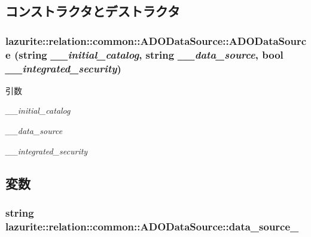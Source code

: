 \subsection{コンストラクタとデストラクタ}
\hypertarget{classlazurite_1_1relation_1_1common_1_1_a_d_o_data_source_ac0e205ee3f2798c66849ce140b9869cc}{
\subsubsection[{ADODataSource}]{\setlength{\rightskip}{0pt plus 5cm}lazurite::relation::common::ADODataSource::ADODataSource (string {\em \_\-\_\-initial\_\-catalog}, \/  string {\em \_\-\_\-data\_\-source}, \/  bool {\em \_\-\_\-integrated\_\-security})}}
\label{classlazurite_1_1relation_1_1common_1_1_a_d_o_data_source_ac0e205ee3f2798c66849ce140b9869cc}

\begin{DoxyParams}{引数}
\item[{\em \_\-\_\-initial\_\-catalog}]\item[{\em \_\-\_\-data\_\-source}]\item[{\em \_\-\_\-integrated\_\-security}]\end{DoxyParams}


\subsection{変数}
\hypertarget{classlazurite_1_1relation_1_1common_1_1_a_d_o_data_source_ac5668e5096adfa6d0db5cd90055b9062}{
\subsubsection[{data\_\-source\_\-}]{\setlength{\rightskip}{0pt plus 5cm}string {\bf lazurite::relation::common::ADODataSource::data\_\-source\_\-}}}
\label{classlazurite_1_1relation_1_1common_1_1_a_d_o_data_source_ac5668e5096adfa6d0db5cd90055b9062}


